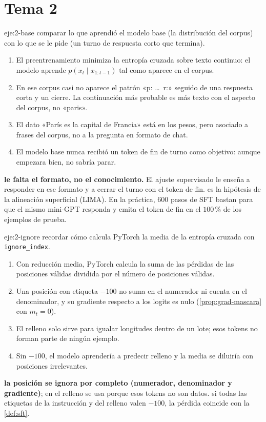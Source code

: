 \section{Tema 2}

\begin{solucion}{eje:2-base}
\planteamiento comparar lo que aprendió el modelo base (la distribución del corpus) con lo que se le pide (un turno de respuesta corto que termina).
\pasos
\begin{enumerate}[label=\arabic*.]
  \item El preentrenamiento minimiza la entropía cruzada sobre texto continuo: el modelo aprende $p(x_t\mid x_{1:t-1})$ tal como aparece en el corpus.
  \item En ese corpus casi no aparece el patrón «p: \dots\ r:» seguido de una respuesta corta y un cierre. La continuación más probable es más texto con el aspecto del corpus, no «paris».
  \item El dato «París es la capital de Francia» está en los pesos, pero asociado a frases del corpus, no a la pregunta en formato de chat.
  \item El modelo base nunca recibió un token de fin de turno como objetivo: aunque empezara bien, no sabría parar.
\end{enumerate}
\resultado \textbf{le falta el formato, no el conocimiento.} El ajuste supervisado le enseña a responder en ese formato y a cerrar el turno con el token de fin.
\comprobacion es la hipótesis de la alineación superficial (LIMA). En la práctica, 600 pasos de SFT bastan para que el mismo mini-GPT responda y emita el token de fin en el $100\,\%$ de los ejemplos de prueba.
\end{solucion}

\begin{solucion}{eje:2-ignore}
\planteamiento recordar cómo calcula PyTorch la media de la entropía cruzada con \texttt{ignore\_\allowbreak index}.
\pasos
\begin{enumerate}[label=\arabic*.]
  \item Con reducción media, PyTorch calcula la suma de las pérdidas de las posiciones válidas dividida por el número de posiciones válidas.
  \item Una posición con etiqueta $-100$ no suma en el numerador ni cuenta en el denominador, y su gradiente respecto a los logits es nulo (\cref{prop:grad-mascara} con $m_t=0$).
  \item El relleno solo sirve para igualar longitudes dentro de un lote; esos tokens no forman parte de ningún ejemplo.
  \item Sin $-100$, el modelo aprendería a predecir relleno y la media se diluiría con posiciones irrelevantes.
\end{enumerate}
\resultado \textbf{la posición se ignora por completo (numerador, denominador y gradiente)}; en el relleno se usa porque esos tokens no son datos.
\comprobacion si todas las etiquetas de la instrucción y del relleno valen $-100$, la pérdida coincide con la \cref{def:sft}.
\end{solucion}

